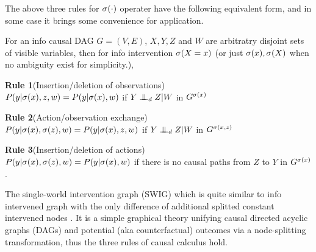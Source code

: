 The above three rules for $\mathrm{\sigma}(\cdot)$ operater have the following equivalent form, and in some case it brings some convenience for application.

\begin{Thm}
	\label{thm:rules}
	For an info causal DAG $G=(V, E)$, $X, Y, Z$ and $W$ are arbitratry disjoint sets of visible variables, then for info intervention $\mathrm{\sigma}(X=x)$ (or just $\mathrm{\sigma}(x), \mathrm{\sigma}(X)$ when no ambiguity exist for simplicity.), 
	
	\textbf{Rule 1}(Insertion/deletion of observations) \\
	$P(y|\mathrm{\sigma}(x), z, w) = P(y|\mathrm{\sigma}(x), w)$ if $Y \perp\mkern-9.5mu\perp_d Z|W$ in $G^{\mathrm{\sigma}(x)}$
	
	\textbf{Rule 2}(Action/observation exchange) \\
	$P(y|\mathrm{\sigma}(x), \mathrm{\sigma}(z), w) = P(y|\mathrm{\sigma}(x), z, w)$ if $Y\perp\mkern-9.5mu\perp_d Z|W$ in $G^{\mathrm{\sigma}(x, z)}$   
	
	\textbf{Rule 3}(Insertion/deletion of actions) \\
	$P(y|\mathrm{\sigma}(x), \mathrm{\sigma}(z), w) = P(y|\mathrm{\sigma}(x), w)$ if there is no causal paths from $Z$ to $Y$ in $G^{\mathrm{\sigma}(x)}$.  
\end{Thm}

The single-world intervention graph (SWIG) which is quite similar to info intervened graph with the only difference of additional splitted constant intervened nodes \cite{Richardson2011, richardson2013single}. It is a simple graphical theory unifying causal directed acyclic graphs (DAGs) and potential (aka counterfactual) outcomes via a node-splitting transformation, thus the three rules of causal calculus hold.




